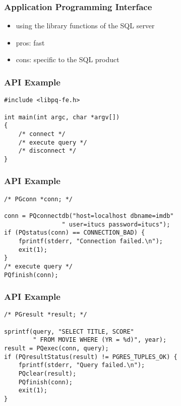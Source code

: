 \documentclass[dvipsnames]{beamer}
\theoremstyle{plain}
\begin{document}
\begin{frame}
  \frametitle{Application Programming Interface}

  \begin{itemize}
    \item using the library functions of the SQL server

    \pause
    \bigskip
    \item pros: fast
    \item cons: specific to the SQL product
  \end{itemize}
\end{frame}

\begin{frame}[fragile]
  \frametitle{API Example}

  \begin{example}[PostgreSQL - C]
    \begin{lstlisting}
#include <libpq-fe.h>

int main(int argc, char *argv[])
{
    /* connect */
    /* execute query */
    /* disconnect */
}
    \end{lstlisting}
  \end{example}
\end{frame}

\begin{frame}[fragile]
  \frametitle{API Example}

  \begin{example}[connecting]
    \begin{lstlisting}
/* PGconn *conn; */

conn = PQconnectdb("host=localhost dbname=imdb"
                " user=itucs password=itucs");
if (PQstatus(conn) == CONNECTION_BAD) {
    fprintf(stderr, "Connection failed.\n");
    exit(1);
}
/* execute query */
PQfinish(conn);
    \end{lstlisting}
  \end{example}
\end{frame}

\begin{frame}[fragile]
  \frametitle{API Example}

  \begin{example}
    \begin{lstlisting}
/* PGresult *result; */

sprintf(query, "SELECT TITLE, SCORE"
        " FROM MOVIE WHERE (YR = %d)", year);
result = PQexec(conn, query);
if (PQresultStatus(result) != PGRES_TUPLES_OK) {
    fprintf(stderr, "Query failed.\n");
    PQclear(result);
    PQfinish(conn);
    exit(1);
}
    \end{lstlisting}
  \end{example}
\end{frame}
\end{document}
